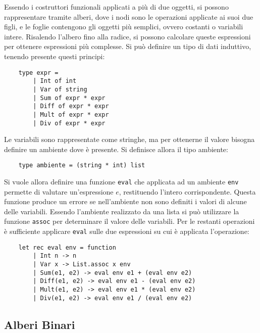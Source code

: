 \documentclass{article}
\numberwithin{equation}{subsection}
\begin{document}
Essendo i costruttori funzionali applicati a più di due oggetti, si possono rappresentare tramite alberi, dove i nodi sono le operazioni applicate ai suoi due figli, e le foglie contengono gli oggetti più semplici, ovvero costanti o variabili intere. Risalendo l'albero fino alla radice, si possono calcolare queste espressioni per ottenere espressioni più complesse. Si può definire un tipo di dati induttivo, tenendo presente questi principi:
\begin{verbatim}
    type expr = 
        | Int of int
        | Var of string
        | Sum of expr * expr
        | Diff of expr * expr
        | Mult of expr * expr
        | Div of expr * expr
\end{verbatim}
Le variabili sono rappresentate come stringhe, ma per ottenerne il valore bisogna definire un ambiente dove è presente. Si definisce allora il tipo ambiente:
\begin{verbatim}
    type ambiente = (string * int) list
\end{verbatim}
Si vuole allora definire una funzione \verb|eval| che applicata ad un ambiente \verb|env| permette di valutare un'espressione $e$, restituendo l'intero corrispondente. 
Questa funzione produce un errore se nell'ambiente non sono definiti i valori di alcune delle variabili. 
Essendo l'ambiente realizzato da una lista si può utilizzare la funzione \verb|assoc| per determinare il valore delle variabili. Per le restanti operazioni è sufficiente applicare \verb|eval| sulle due espressioni su cui è applicata l'operazione:
\begin{verbatim}
    let rec eval env = function
        | Int n -> n
        | Var x -> List.assoc x env
        | Sum(e1, e2) -> eval env e1 + (eval env e2)
        | Diff(e1, e2) -> eval env e1 - (eval env e2)
        | Mult(e1, e2) -> eval env e1 * (eval env e2)
        | Div(e1, e2) -> eval env e1 / (eval env e2)    
\end{verbatim}

\subsection{Alberi Binari}
\end{document}
